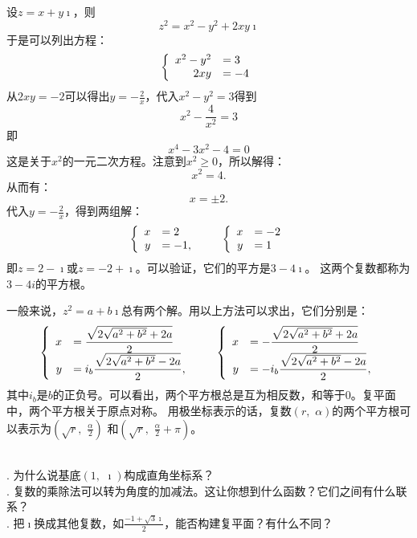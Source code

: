 \documentclass[12pt,UTF8]{ctexbook}
\begin{document}
\begin{so}
    设$z = x + y\imath$，则
    $$ z^2 = x^2 - y^2 + 2xy\imath$$
    于是可以列出方程：
    $$
    \left\{
        \begin{array}[]{rl}
            x^2 - y^2 &= 3 \\
            2xy &= -4
        \end{array}
    \right.
    $$
    从$2xy = -2$可以得出$y = -\frac{2}{x}$，代入$x^2 - y^2 = 3$得到
    $$ x^2 - \frac{4}{x^2} = 3$$
    即
    $$ x^4 - 3x^2 - 4 = 0$$
    这是关于$x^2$的一元二次方程。注意到$x^2 \geqslant 0$，所以解得：
    $$ x^2 = 4. $$
    从而有：
    $$ x = \pm 2 . $$
    代入$y = -\frac{2}{x}$，得到两组解：
    $$
    \left\{
        \begin{array}[]{rl}
            x &= 2 \\
            y &= -1,
        \end{array}
    \right.
    \qquad
    \left\{
        \begin{array}[]{rl}
            x &= -2 \\
            y &= 1
        \end{array}
    \right.
    $$ 
    即$z = 2 - \imath$或$z = -2 + \imath$。可以验证，它们的平方是$3 - 4\imath$。
    这两个复数都称为$3 - 4i$的平方根。
\end{so}

一般来说，$z^2 = a + b\imath$总有两个解。用以上方法可以求出，它们分别是：
$$
\left\{
    \begin{array}[]{rl}
        x &=\displaystyle \frac{\sqrt{2\sqrt{a^2 + b^2} + 2a}}{2} \\
        y &=\displaystyle i_b \frac{\sqrt{2\sqrt{a^2 + b^2} - 2a}}{2},
    \end{array}
\right.
\qquad
\left\{
    \begin{array}[]{rl}
        x &=\displaystyle -\frac{\sqrt{2\sqrt{a^2 + b^2} + 2a}}{2} \\
        y &=\displaystyle -i_b \frac{\sqrt{2\sqrt{a^2 + b^2} - 2a}}{2},
    \end{array}
\right.
$$ 
其中$i_b$是$b$的正负号。可以看出，两个平方根总是互为相反数，和等于$0$。复平面中，两个平方根关于原点对称。
用极坐标表示的话，复数$(r,\,\,\alpha)$的两个平方根可以表示为$\displaystyle\left(\sqrt{r},\,\,\frac{\alpha}{2}\right)$
和$\displaystyle\left(\sqrt{r},\,\,\frac{\alpha}{2}+\pi\right)$。

\begin{sk}
    \mbox{} \\
    . 为什么说基底$(1,\,\,\imath)$构成直角坐标系？\\
    . 复数的乘除法可以转为角度的加减法。这让你想到什么函数？它们之间有什么联系？\\
    . 把$\imath$换成其他复数，如$\displaystyle \frac{-1+\sqrt{3}\imath}{2}$，能否构建复平面？有什么不同？
\end{sk}
\end{document}

